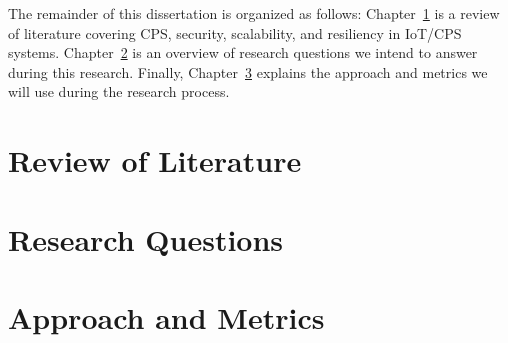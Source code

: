 \documentclass[]{report}
\begin{document}
The remainder of this dissertation is organized as follows: Chapter~\ref{chap:lit} is a review of literature covering CPS, security, scalability, and resiliency in IoT/CPS systems. Chapter~\ref{chap:questions} is an overview of research questions we intend to answer during this research. Finally, Chapter~\ref{chap:app} explains the approach and metrics we will use during the research process. 


\chapter{Review of Literature}
\label{chap:lit}



\chapter{Research Questions}
\label{chap:questions}
{}

\chapter{Approach and Metrics}
\label{chap:app}
{}

{}


{%



}

\printnomenclature[0.5in] %

\appendix
{}
\end{document}

